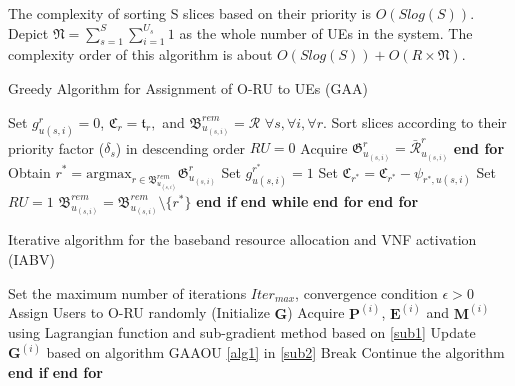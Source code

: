 \documentclass[lettersize,journal]{IEEEtran}
\begin{document}
The complexity of sorting S slices based on their priority is $O(Slog(S))$.
Depict $\mathfrak{N} =  \sum_{s=1}^S\sum_{i=1}^{U_s} 1$ as the whole number of UEs in the system. 
The complexity order of this algorithm is about $O(Slog(S)) + O(R\times \mathfrak{N})$.
\begin{algorithm}
\small
\caption{Greedy Algorithm for Assignment of O-RU to UEs (GAA)}\label{alg1}
\begin{algorithmic}[1]
\State Set $g^r_{u(s,i)} = 0$, $\mathfrak{C}_r = \mathfrak{t}_r,$ and ${\mathfrak{B}}^{rem}_{u_{(s,i)}} = \mathcal{R}$   $\forall s, \forall i, \forall r$.\label{31}
\State Sort slices according to their priority factor ($\delta_s$) in descending order
\label{33}
\State $RU = 0$
\State Acquire $\mathfrak{G}^r_{u_{(s,i)}} = \bar{\mathcal{R}}^r_{u_{(s,i)}}$
\EndFor
\State \textbf{end for}
\State Obtain $r^* = \text{argmax}_{r\in{\mathfrak{B}}^{rem}_{u_{(s,i)}}} \mathfrak{G}^r_{u_{(s,i)}}$
\State Set $g^{r^*}_{u(s,i)} = 1$ 
\State Set  $\mathfrak{C}_{r^*} = \mathfrak{C}_{r^*} - \psi_{{r^*},u(s,i)}$
\State Set $RU = 1$ 
\Else
\State  ${\mathfrak{B}}^{rem}_{u_{(s,i)}} = {\mathfrak{B}}^{rem}_{u_{(s,i)}} \setminus \{{r^*}\} $
\EndIf
\State \textbf{end if}
\EndWhile
\State \textbf{end while}
\EndFor
\State \textbf{end for}
\EndFor
\State \textbf{end for} \label{34}
\end{algorithmic}
\end{algorithm}

 \begin{algorithm}
 \small
\caption{Iterative algorithm for the baseband resource allocation and VNF activation (IABV)}\label{alg2}
\begin{algorithmic}[1]
\State  Set the maximum number of iterations ${Iter}_{max}$, convergence condition $\epsilon > 0$ \label{a21}
\State  Assign Users to O-RU randomly (Initialize $\boldsymbol{G}$) \label{a22}
\label{23}
\State Acquire $\boldsymbol{P}^{(i)}$, $\boldsymbol{E}^{(i)}$ and $\boldsymbol{M}^{(i)}$ using Lagrangian function and sub-gradient method based on \eqref{sub1}
\State Update $\boldsymbol{G}^{(i)}$   based on algorithm GAAOU \eqref{alg1} in  \eqref{sub2}
\State Break
\Else 
\State Continue the algorithm  
\EndIf
\State \textbf{end if}
\EndFor
\State \textbf{end for} \label{24}
\end{algorithmic}
\end{algorithm} 
\end{document}
